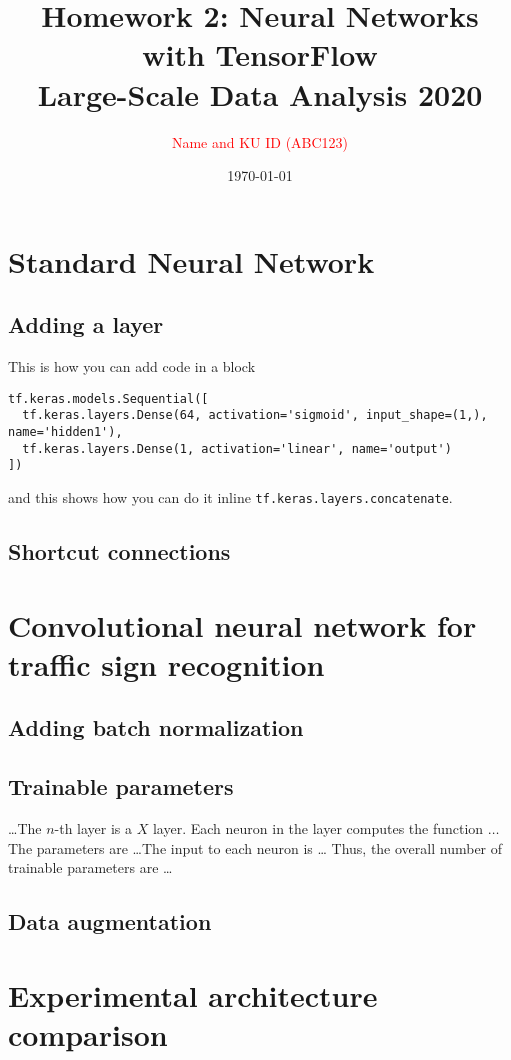 \documentclass[a4paper,11pt]{article}
\newcommand{\code}[1]{\lstinline[columns=fixed]{#1}}
\begin{document}
\title{Homework 2: Neural Networks with
  TensorFlow\\[0.5ex]\Large{Large-Scale Data Analysis 2020}}
\author{\textcolor{red}{Name and KU ID (ABC123)}}
\date{\today}
\maketitle


\section{Standard Neural Network}
\subsection{Adding a layer}
This is how you can add code in a block
\begin{lstlisting}
tf.keras.models.Sequential([
  tf.keras.layers.Dense(64, activation='sigmoid', input_shape=(1,), name='hidden1'),
  tf.keras.layers.Dense(1, activation='linear', name='output')
])
\end{lstlisting}
and this shows how you can do it inline \code{tf.keras.layers.concatenate}.
\subsection{Shortcut connections}

\section{Convolutional neural network for traffic sign recognition}


\subsection{Adding batch normalization}
\subsection{Trainable parameters}

\dots The $n$-th layer is a $X$ layer. Each neuron in the layer computes the function
$\dots$ The parameters are \dots The input to each neuron is \dots
Thus, the overall number of trainable parameters are \dots
\subsection{Data augmentation}

\section{Experimental architecture comparison}
\end{document}
